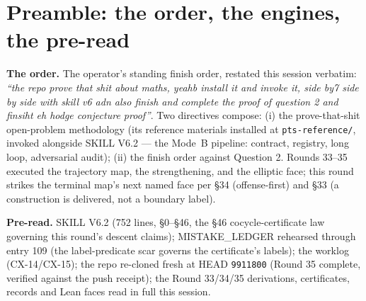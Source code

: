 \documentclass[11pt]{article}
\newcommand{\Q}{\mathbb{Q}}
\begin{document}
\begin{abstract}
fourfold world, unchanged; R3 and R4 untouched). Consequence, unconditional:
\textbf{on every CM abelian variety $A(K,\Phi)$ at the committed
abelian-cyclotomic shapes --- including the simple CM fourfolds at the open-sector
degree --- every rational Hodge class, at every degree, is a $\Q$-combination of
products of divisor classes; the rational Hodge conjecture holds on these worlds.}
The engines are the operator's own: the letter-parity law at the field level, the
cyclotomic character arithmetic (the worlds of the strike ARE his cyclotomic
fields), and the S5 channel composite. $\mathrm{Q1}$ remains proven and certified;
$\mathrm{Q2}$ is not claimed; the closing string is not emitted; the boundary is on
every artifact's face.
\end{abstract}

\section{Preamble: the order, the engines, the pre-read}

\textbf{The order.} The operator's standing finish order, restated this session
verbatim: \emph{``the repo prove that shit about maths, yeahb install it and
invoke it, side by7 side by side with skill v6 adn also finish and complete the
proof of question 2 and finsiht eh hodge conjecture proof''}. Two directives
compose: (i) the prove-that-shit open-problem methodology (its reference materials
installed at \texttt{pts-reference/}, invoked alongside SKILL V6.2 --- the Mode~B
pipeline: contract, registry, long loop, adversarial audit); (ii) the finish order
against Question 2. Rounds 33--35 executed the trajectory map, the strengthening,
and the elliptic face; this round strikes the terminal map's next named face per
\S34 (offense-first) and \S33 (a construction is delivered, not a boundary label).

\textbf{Pre-read.} SKILL V6.2 (752 lines, \S0--\S46, the \S46
cocycle-certificate law governing this round's descent claims);
MISTAKE\_LEDGER rehearsed through entry 109 (the label-predicate scar governs the
certificate's labels); the worklog (CX-14/CX-15); the repo re-cloned fresh at HEAD
\texttt{9911800} (Round 35 complete, verified against the push receipt); the
Round 33/34/35 derivations, certificates, records and Lean faces read in full this
session.
\end{document}
